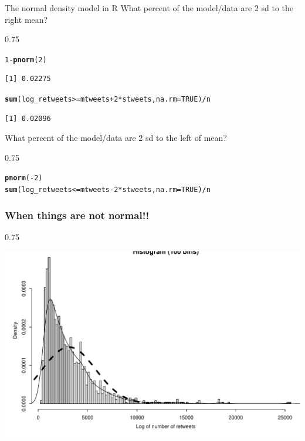 \documentclass{beamer}\usepackage[]{graphicx}\usepackage[]{color}
\makeatletter
\newcommand{\hlnum}[1]{\textcolor[rgb]{0.2,0.2,0.2}{#1}}%
\newcommand{\hlopt}[1]{\textcolor[rgb]{0.102,0.102,0.102}{#1}}%
\newcommand{\hlstd}[1]{\textcolor[rgb]{0.102,0.102,0.102}{#1}}%
\newcommand{\hlkwc}[1]{\textcolor[rgb]{0.2,0.2,0.2}{#1}}%
\newcommand{\hlkwd}[1]{\textcolor[rgb]{0.102,0.102,0.102}{\textbf{#1}}}%
\newenvironment{kframe}{%
 \def\at@end@of@kframe{}%
 \ifinner\ifhmode%
  \def\at@end@of@kframe{\end{minipage}}%
  \begin{minipage}{\columnwidth}%
 \fi\fi%
 \def\FrameCommand##1{\hskip\@totalleftmargin \hskip-\fboxsep
 \colorbox{shadecolor}{##1}\hskip-\fboxsep
     \hskip-\linewidth \hskip-\@totalleftmargin \hskip\columnwidth}%
 \MakeFramed {\advance\hsize-\width
   \@totalleftmargin\z@ \linewidth\hsize
   \@setminipage}}%
 {\par\unskip\endMakeFramed%
 \at@end@of@kframe}
\newenvironment{knitrout}{}{} %
\renewenvironment{knitrout}{\begin{spacing}{0.75}\begin{tiny}}{\end{tiny}\end{spacing}}
\makeatother
\begin{document}
\begin{frame}{The normal density model in R\;\;}
What percent of the model/data are 2 sd to the right mean?
\begin{knitrout}\small
{}\color{fgcolor}\begin{kframe}
\begin{alltt}
\hlnum{1} \hlopt{-} \hlkwd{pnorm}\hlstd{(}\hlnum{2}\hlstd{)}
\end{alltt}
\begin{verbatim}
[1] 0.02275
\end{verbatim}
\begin{alltt}
\hlkwd{sum}\hlstd{(log_retweets} \hlopt{>=} \hlstd{mtweets} \hlopt{+} \hlnum{2}\hlopt{*}\hlstd{stweets,} \hlkwc{na.rm}\hlstd{=}\hlnum{TRUE}\hlstd{)} \hlopt{/} \hlstd{n}
\end{alltt}
\begin{verbatim}
[1] 0.02096
\end{verbatim}
\end{kframe}
\end{knitrout}

What percent of the model/data are 2 sd to the left of mean?
\begin{knitrout}\small
{}\color{fgcolor}\begin{kframe}
\begin{alltt}
\hlkwd{pnorm}\hlstd{(}\hlopt{-}\hlnum{2}\hlstd{)}
\hlkwd{sum}\hlstd{(log_retweets} \hlopt{<=} \hlstd{mtweets} \hlopt{-} \hlnum{2}\hlopt{*}\hlstd{stweets,} \hlkwc{na.rm}\hlstd{=}\hlnum{TRUE}\hlstd{)} \hlopt{/} \hlstd{n}
\end{alltt}
\end{kframe}
\end{knitrout}

\end{frame}

\begin{frame}
\frametitle{When things are not normal!!}
\begin{knitrout}\small
{}\color{fgcolor}

{\centering \includegraphics[width=0.89\linewidth]{figure/graphics-unnamed-chunk-18-1} 

}



\end{knitrout}
\end{frame}
\end{document}
